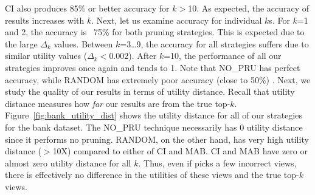 CI also produces 85\% or better accuracy for $k$$>$10.
As expected, the accuracy of results increases with $k$.
Next, let us examine accuracy for individual $k$s.
For $k$=1 and 2, the accuracy is ~75\% for both pruning strategies. This is expected due to the large 
$\Delta_k$ values.
Between $k$=3\ldots9, the accuracy for all strategies suffers due to similar utility values 
($\Delta_k < 0.002$).
After $k$=10, the performance of all our strategies improves once again and tends to 1.
Note that NO\_PRU has perfect accuracy, while RANDOM has extremely poor accuracy (close to 50\%) .
Next, we study the quality of our results in terms of utility distance. 
Recall that utility distance measures how {\it far} our results are from the true top-$k$.
Figure~\ref{fig:bank_utility_dist} shows the utility distance for
all of our strategies for the bank dataset.
The NO\_PRU technique necessarily has 0 utility distance since
it performs no pruning.
RANDOM, on the other hand, has very high utility distance ($>$10X) compared to either of 
CI and MAB.
CI and MAB have zero or almost zero utility distance for all $k$.
Thus, even if \SeeDB picks a few incorrect views, there is effectively no difference in the 
utilities of these views and the true top-$k$ views.

